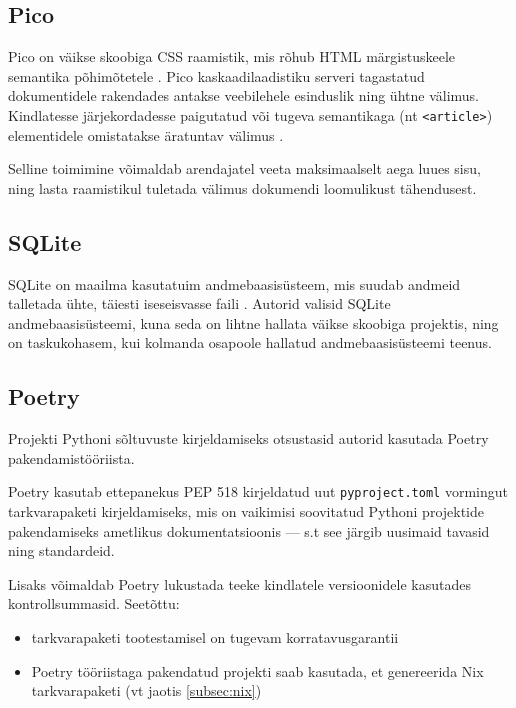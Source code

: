 \subsection{Pico}

Pico on väikse skoobiga CSS raamistik, mis rõhub HTML märgistuskeele semantika põhimõtetele \cite{pico}. Pico kaskaadilaadistiku serveri tagastatud dokumentidele rakendades antakse veebilehele esinduslik ning ühtne välimus. Kindlatesse järjekordadesse paigutatud või tugeva semantikaga (nt \texttt{<article>}) elementidele omistatakse äratuntav välimus \cite{pico-nav}.

Selline toimimine võimaldab arendajatel veeta maksimaalselt aega luues sisu, ning lasta raamistikul tuletada välimus dokumendi loomulikust tähendusest.

\subsection{SQLite}

SQLite on maailma kasutatuim andmebaasisüsteem\cite{sqlite}, mis suudab andmeid talletada ühte, täiesti iseseisvasse faili \cite{sqlite-db-file}. Autorid valisid SQLite andmebaasisüsteemi, kuna seda on lihtne hallata väikse skoobiga projektis, ning on taskukohasem, kui kolmanda osapoole hallatud andmebaasisüsteemi teenus.

\subsection{Poetry}

Projekti Pythoni sõltuvuste kirjeldamiseks otsustasid autorid kasutada Poetry pakendamistööriista.

Poetry kasutab ettepanekus PEP 518 \cite{pep518} kirjeldatud uut \texttt{pyproject.toml} vormingut tarkvarapaketi kirjeldamiseks, mis on vaikimisi soovitatud Pythoni projektide pakendamiseks ametlikus dokumentatsioonis \cite{python-packaging} — s.t see järgib uusimaid tavasid ning standardeid.

Lisaks võimaldab Poetry lukustada teeke kindlatele versioonidele kasutades kontrollsummasid. Seetõttu:

\begin{itemize}
  \item tarkvarapaketi tootestamisel on tugevam korratavusgarantii
  \item Poetry tööriistaga pakendatud projekti saab kasutada, et genereerida Nix tarkvarapaketi (vt jaotis \ref{subsec:nix})
\end{itemize}

